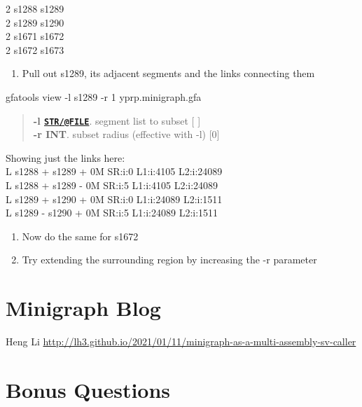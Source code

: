 \documentclass[
]{book}
\newenvironment{Shaded}{\begin{snugshade}}{\end{snugshade}}
\newcommand{\AttributeTok}[1]{\textcolor[rgb]{0.77,0.63,0.00}{#1}}
\newcommand{\ExtensionTok}[1]{#1}
\newcommand{\NormalTok}[1]{#1}
\providecommand{\tightlist}{%
  \setlength{\itemsep}{0pt}\setlength{\parskip}{0pt}}
\begin{document}
2 s1288 s1289\\
2 s1289 s1290\\
2 s1671 s1672\\
2 s1672 s1673

\begin{enumerate}
\def\labelenumi{\arabic{enumi}.}
\tightlist
\item
  Pull out s1289, its adjacent segments and the links connecting them
\end{enumerate}

\begin{Shaded}
\begin{Highlighting}[]
\ExtensionTok{gfatools}\NormalTok{ view }\AttributeTok{{-}l}\NormalTok{ s1289 }\AttributeTok{{-}r}\NormalTok{ 1 yprp.minigraph.gfa}
\end{Highlighting}
\end{Shaded}

\begin{quote}
\textbf{-l \href{mailto:STR/@FILE}{\nolinkurl{STR/@FILE}}}. segment list to subset {[} {]}\\
\textbf{-r INT}. subset radius (effective with -l) {[}0{]}
\end{quote}

Showing just the links here:\\
L s1288 + s1289 + 0M SR:i:0 L1:i:4105 L2:i:24089\\
L s1288 + s1289 - 0M SR:i:5 L1:i:4105 L2:i:24089\\
L s1289 + s1290 + 0M SR:i:0 L1:i:24089 L2:i:1511\\
L s1289 - s1290 + 0M SR:i:5 L1:i:24089 L2:i:1511

\begin{enumerate}
\def\labelenumi{\arabic{enumi}.}
\setcounter{enumi}{1}
\item
  Now do the same for s1672
\item
  Try extending the surrounding region by increasing the -r parameter
\end{enumerate}

\hypertarget{minigraph-blog}{%
\section{Minigraph Blog}\label{minigraph-blog}}

Heng Li
\url{http://lh3.github.io/2021/01/11/minigraph-as-a-multi-assembly-sv-caller}

\hypertarget{bonus-questions}{%
\section{Bonus Questions}\label{bonus-questions}}
\end{document}
